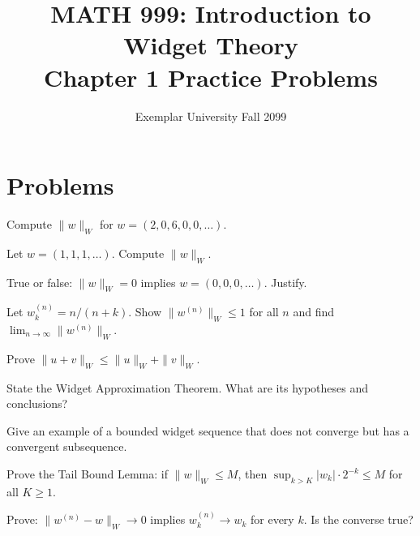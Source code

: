 \documentclass[10pt, a4paper]{article}
\title{\textbf{MATH 999: Introduction to Widget Theory}\\[4pt]
  {\Large Chapter 1 Practice Problems}}
\author{{\small Exemplar University \quad Fall 2099}}
\date{}
\begin{document}
\maketitle
\thispagestyle{fancy}
\newpage


\section*{Problems}

\begin{qeasy}[Q1]
Compute $\|w\|_W$ for $w = (2, 0, 6, 0, 0, \ldots)$.
\end{qeasy}

\begin{qeasy}[Q2]
Let $w = (1, 1, 1, \ldots)$. Compute $\|w\|_W$.
\end{qeasy}

\begin{qeasy}[Q3]
True or false: $\|w\|_W = 0$ implies $w = (0, 0, 0, \ldots)$.
Justify.
\end{qeasy}

\begin{qmedium}[Q4]
Let $w^{(n)}_k = n/(n+k)$. Show $\|w^{(n)}\|_W \le 1$ for
all $n$ and find $\lim_{n \to \infty} \|w^{(n)}\|_W$.
\end{qmedium}

\begin{qmedium}[Q5]
Prove $\|u + v\|_W \le \|u\|_W + \|v\|_W$.
\end{qmedium}

\begin{qmedium}[Q6]
State the Widget Approximation Theorem. What are its hypotheses
and conclusions?
\end{qmedium}

\begin{qmedium}[Q7]
Give an example of a bounded widget sequence that does not
converge but has a convergent subsequence.
\end{qmedium}

\begin{qhard}[Q8]
Prove the Tail Bound Lemma: if $\|w\|_W \le M$, then
$\sup_{k > K} |w_k| \cdot 2^{-k} \le M$ for all $K \ge 1$.
\end{qhard}

\begin{qhard}[Q9]
Prove: $\|w^{(n)} - w\|_W \to 0$ implies $w^{(n)}_k \to w_k$
for every $k$. Is the converse true?
\end{qhard}
\end{document}
